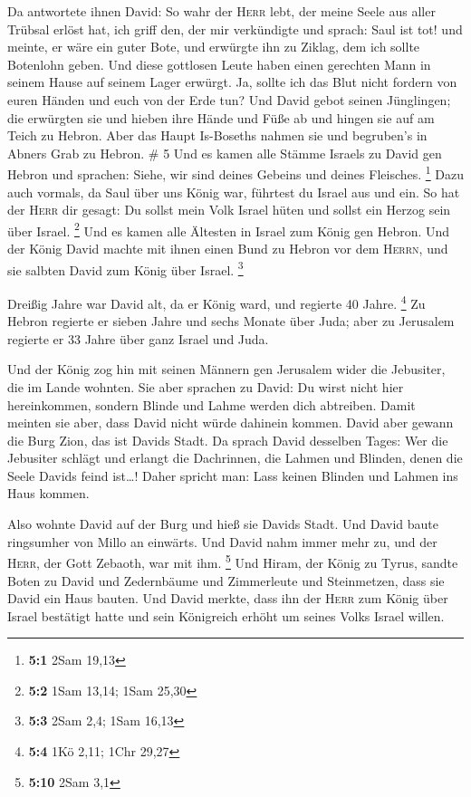  Da antwortete ihnen David: So wahr der \textsc{Herr}
lebt, der meine Seele aus aller Trübsal erlöst hat,  ich
griff den, der mir verkündigte und sprach: Saul ist tot! und meinte, er
wäre ein guter Bote, und erwürgte ihn zu Ziklag, dem ich sollte
Botenlohn geben.  Und diese gottlosen Leute haben einen
gerechten Mann in seinem Hause auf seinem Lager erwürgt. Ja, sollte ich
das Blut nicht fordern von euren Händen und euch von der Erde tun?
 Und David gebot seinen Jünglingen; die erwürgten sie und
hieben ihre Hände und Füße ab und hingen sie auf am Teich zu Hebron.
Aber das Haupt Is-Boseths nahmen sie und begruben's in Abners Grab zu
Hebron. \# 5  Und es kamen alle Stämme Israels zu David
gen Hebron und sprachen: Siehe, wir sind deines Gebeins und deines
Fleisches. \footnote{\textbf{5:1} 2Sam 19,13}  Dazu auch
vormals, da Saul über uns König war, führtest du Israel aus und ein. So
hat der \textsc{Herr} dir gesagt: Du sollst mein Volk Israel hüten und
sollst ein Herzog sein über Israel. \footnote{\textbf{5:2} 1Sam 13,14;
  1Sam 25,30}  Und es kamen alle Ältesten in Israel zum
König gen Hebron. Und der König David machte mit ihnen einen Bund zu
Hebron vor dem \textsc{Herrn}, und sie salbten David zum König über
Israel. \footnote{\textbf{5:3} 2Sam 2,4; 1Sam 16,13}

 Dreißig Jahre war David alt, da er König ward, und
regierte 40 Jahre. \footnote{\textbf{5:4} 1Kö 2,11; 1Chr 29,27}
 Zu Hebron regierte er sieben Jahre und sechs Monate über
Juda; aber zu Jerusalem regierte er 33 Jahre über ganz Israel und Juda.

 Und der König zog hin mit seinen Männern gen Jerusalem
wider die Jebusiter, die im Lande wohnten. Sie aber sprachen zu David:
Du wirst nicht hier hereinkommen, sondern Blinde und Lahme werden dich
abtreiben. Damit meinten sie aber, dass David nicht würde dahinein
kommen.  David aber gewann die Burg Zion, das ist Davids
Stadt.  Da sprach David desselben Tages: Wer die Jebusiter
schlägt und erlangt die Dachrinnen, die Lahmen und Blinden, denen die
Seele Davids feind ist\ldots! Daher spricht man: Lass keinen Blinden und
Lahmen ins Haus kommen.

 Also wohnte David auf der Burg und hieß sie Davids Stadt.
Und David baute ringsumher von Millo an einwärts.  Und
David nahm immer mehr zu, und der \textsc{Herr}, der Gott Zebaoth, war
mit ihm. \footnote{\textbf{5:10} 2Sam 3,1}  Und Hiram,
der König zu Tyrus, sandte Boten zu David und Zedernbäume und
Zimmerleute und Steinmetzen, dass sie David ein Haus bauten.
 Und David merkte, dass ihn der \textsc{Herr} zum König
über Israel bestätigt hatte und sein Königreich erhöht um seines Volks
Israel willen.

